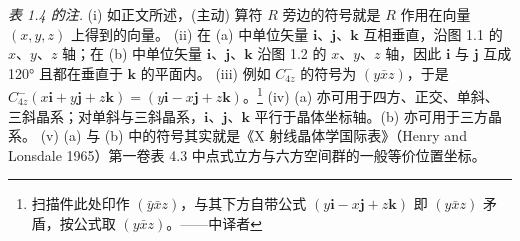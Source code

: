 \noindent{}

\smallskip
\parbox{0.92\textwidth}{\textit{表 1.4 的注.}
(i) 如正文所述，(主动) 算符 $R$ 旁边的符号就是 $R$ 作用在向量 $(x, y, z)$ 上得到的向量。
(ii) 在 (a) 中单位矢量 $\mathbf{i}$、$\mathbf{j}$、$\mathbf{k}$ 互相垂直，沿图 1.1 的 $x$、$y$、$z$ 轴；在 (b) 中单位矢量 $\mathbf{i}$、$\mathbf{j}$、$\mathbf{k}$ 沿图 1.2 的 $x$、$y$、$z$ 轴，因此 $\mathbf{i}$ 与 $\mathbf{j}$ 互成 120° 且都在垂直于 $\mathbf{k}$ 的平面内。
(iii) 例如 $C_{4z}^{-}$ 的符号为 $(y\bar{x}z)$，于是 $C_{4z}^{-}(x\mathbf{i} + y\mathbf{j} + z\mathbf{k}) = (y\mathbf{i} - x\mathbf{j} + z\mathbf{k})$。\footnote{扫描件此处印作 $(\bar{y}\bar{x}z)$，与其下方自带公式 $(y\mathbf{i} - x\mathbf{j} + z\mathbf{k})$ 即 $(y\bar{x}z)$ 矛盾，按公式取 $(y\bar{x}z)$。——中译者}
(iv) (a) 亦可用于四方、正交、单斜、三斜晶系；对单斜与三斜晶系，$\mathbf{i}$、$\mathbf{j}$、$\mathbf{k}$ 平行于晶体坐标轴。(b) 亦可用于三方晶系。
(v) (a) 与 (b) 中的符号其实就是《X 射线晶体学国际表》（Henry and Lonsdale 1965）第一卷表 4.3 中点式立方与六方空间群的一般等价位置坐标。}
